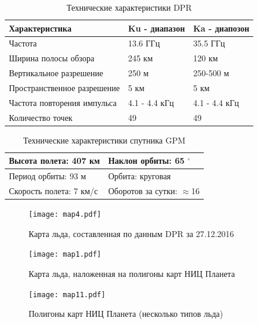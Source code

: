 \begin{table}[h!]
  \centering
  \caption{Технические характеристики DPR}
  \vspace{10 pt}
  \begin{tabular}{l|l|l}
   Характеристика & Ku - диапазон & Ka - диапозон \\ \hline
   Частота & 13.6 ГГц & 35.5 ГГц \\ \hline
   Ширина полосы обзора & 245 км & 120 км \\\hline
   Вертикальное разрешение & 250 м & 250-500 м \\\hline
   Пространственное разрешение & 5 км & 5 км \\\hline
   Частота повторения импульса & 4.1 - 4.4 кГц & 4.1 - 4.4 кГц \\\hline
   Количество точек & 49 & 49 
   \end{tabular}
  
  \label{tab:1}
\end{table}

\begin{table}[h!]
  \centering
  \caption{Технические характеристики спутника GPM}
  \vspace{10 pt}
  \begin{tabular}{l|l}
   Высота полета: 407 км & Наклон орбиты: 65 $^{\circ}$\\ \hline
     Период орбиты: 93 м & Орбита: круговая \\ \hline
     Скорость полета: 7 км/с & Оборотов за сутки: $\approx$16
  \end{tabular}
  
  \label{tab:1}
\end{table}


\begin{figure}[h!]
  \centering
  \texttt{[image: map4.pdf]}
  \caption{Карта льда, составленная по данным DPR за 27.12.2016}
  \label{fig:13}
\end{figure}

\begin{figure}[h!]
  \centering
  \begin{minipage}{0.49\linewidth}
    \texttt{[image: map1.pdf]}
    \caption{Карта льда, наложенная на полигоны карт НИЦ Планета}
    \label{fig:14}
  \end{minipage}
  \begin{minipage}{0.49\linewidth}
    \texttt{[image: map11.pdf]}
    \caption{Полигоны карт НИЦ Планета (несколько типов льда)}
    \label{fig:15}
  \end{minipage}

\end{figure}




